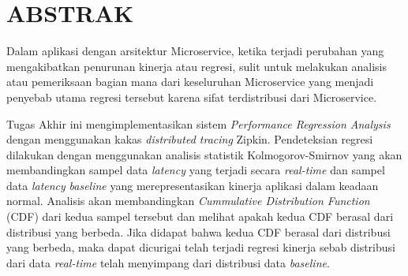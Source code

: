 \clearpage
\chapter*{ABSTRAK}

Dalam aplikasi dengan arsitektur Microservice, ketika terjadi perubahan yang mengakibatkan penurunan kinerja atau regresi, sulit untuk melakukan analisis atau pemeriksaan bagian mana dari keseluruhan Microservice yang menjadi penyebab utama regresi tersebut karena sifat terdistribusi dari Microservice. 
%

Tugas Akhir ini mengimplementasikan sistem \textit{Performance Regression Analysis} dengan menggunakan kakas \textit{distributed tracing} Zipkin. Pendeteksian regresi dilakukan dengan menggunakan analisis statistik Kolmogorov-Smirnov yang akan membandingkan sampel data \textit{latency} yang terjadi secara \textit{real-time} dan sampel data \textit{latency} \textit{baseline} yang merepresentasikan kinerja aplikasi dalam keadaan normal. Analisis akan membandingkan \textit{Cummulative Distribution Function} (CDF) dari kedua sampel tersebut dan melihat apakah kedua CDF berasal dari distribusi yang berbeda. Jika didapat bahwa kedua CDF berasal dari distribusi yang berbeda, maka dapat dicurigai telah terjadi regresi kinerja sebab distribusi dari data \textit{real-time} telah menyimpang dari distribusi data \textit{baseline}.

